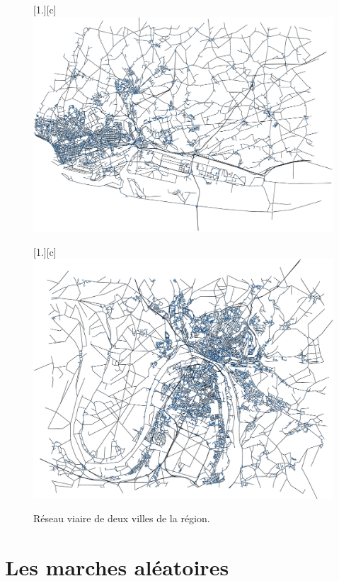 \documentclass[a4paper, 10pt]{report}
\begin{document}
\begin{figure}[h!]
  \centering
  [1.\linewidth][c]{
    \includegraphics[width=1.\linewidth]{./img/screenshot_Le_Havre.pdf}
  }

   [1.\linewidth][c]{
    \includegraphics[width=1.\linewidth]{./img/screenshot_Rouen.pdf}
  }
  \caption{Réseau viaire de deux villes de la région.}
  \label{fig:reseaux_viaires}
\end{figure}

\chapter{Les marches aléatoires}
\end{document}

